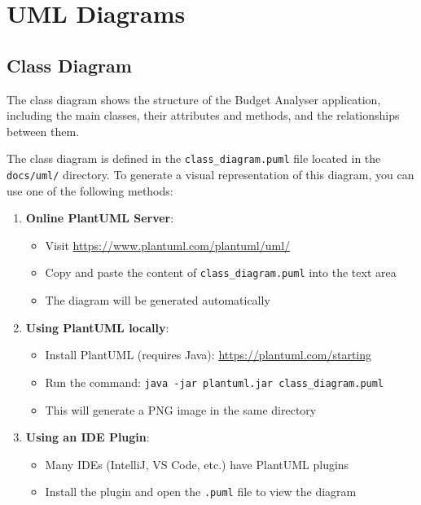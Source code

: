 \documentclass[11pt,a4paper]{report}
\begin{document}
\chapter{UML Diagrams}

\section{Class Diagram}
The class diagram shows the structure of the Budget Analyser application, including the main classes, their attributes and methods, and the relationships between them.

The class diagram is defined in the \texttt{class\_diagram.puml} file located in the \texttt{docs/uml/} directory. To generate a visual representation of this diagram, you can use one of the following methods:

\begin{enumerate}
    \item \textbf{Online PlantUML Server}:
    \begin{itemize}
        \item Visit \url{https://www.plantuml.com/plantuml/uml/}
        \item Copy and paste the content of \texttt{class\_diagram.puml} into the text area
        \item The diagram will be generated automatically
    \end{itemize}
    
    \item \textbf{Using PlantUML locally}:
    \begin{itemize}
        \item Install PlantUML (requires Java): \url{https://plantuml.com/starting}
        \item Run the command: \texttt{java -jar plantuml.jar class\_diagram.puml}
        \item This will generate a PNG image in the same directory
    \end{itemize}
    
    \item \textbf{Using an IDE Plugin}:
    \begin{itemize}
        \item Many IDEs (IntelliJ, VS Code, etc.) have PlantUML plugins
        \item Install the plugin and open the \texttt{.puml} file to view the diagram
    \end{itemize}
\end{enumerate}
\end{document}
